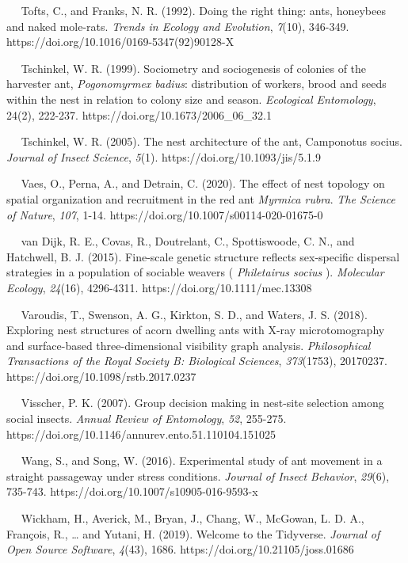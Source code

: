 \documentclass[3p]{elsarticle} %
\begin{document}
~~ Tofts, C., and Franks, N. R. (1992). Doing the right thing: ants,
honeybees and naked mole-rats. \emph{Trends in Ecology and Evolution},
\emph{7}(10), 346-349. https://doi.org/10.1016/0169-5347(92)90128-X

~~ Tschinkel, W. R. (1999). Sociometry and sociogenesis of colonies of
the harvester ant, \emph{Pogonomyrmex badius}: distribution of workers,
brood and seeds within the nest in relation to colony size and season.
\emph{Ecological Entomology}, 24(2), 222-237.
https://doi.org/10.1673/2006\_06\_32.1

~~ Tschinkel, W. R. (2005). The nest architecture of the ant, Camponotus
socius. \emph{Journal of Insect Science}, \emph{5}(1).
https://doi.org/10.1093/jis/5.1.9

~~ Vaes, O., Perna, A., and Detrain, C. (2020). The effect of nest
topology on spatial organization and recruitment in the red ant
\emph{Myrmica rubra}. \emph{The Science of Nature}, \emph{107}, 1-14.
https://doi.org/10.1007/s00114-020-01675-0

~~ van Dijk, R. E., Covas, R., Doutrelant, C., Spottiswoode, C. N., and
Hatchwell, B. J. (2015). Fine-scale genetic structure reflects
sex-specific dispersal strategies in a population of sociable weavers (
\emph{Philetairus socius} ). \emph{Molecular Ecology}, \emph{24}(16),
4296-4311. https://doi.org/10.1111/mec.13308

~~ Varoudis, T., Swenson, A. G., Kirkton, S. D., and Waters, J. S.
(2018). Exploring nest structures of acorn dwelling ants with X-ray
microtomography and surface-based three-dimensional visibility graph
analysis. \emph{Philosophical Transactions of the Royal Society B:
Biological Sciences}, \emph{373}(1753), 20170237.
https://doi.org/10.1098/rstb.2017.0237

~~ Visscher, P. K. (2007). Group decision making in nest-site selection
among social insects. \emph{Annual Review of Entomology}, \emph{52},
255-275. https://doi.org/10.1146/annurev.ento.51.110104.151025

~~ Wang, S., and Song, W. (2016). Experimental study of ant movement in
a straight passageway under stress conditions. \emph{Journal of Insect
Behavior}, \emph{29}(6), 735-743.
https://doi.org/10.1007/s10905-016-9593-x

~~ Wickham, H., Averick, M., Bryan, J., Chang, W., McGowan, L. D. A.,
François, R., \ldots{} and Yutani, H. (2019). Welcome to the Tidyverse.
\emph{Journal of Open Source Software}, \emph{4}(43), 1686.
https://doi.org/10.21105/joss.01686
\end{document}
